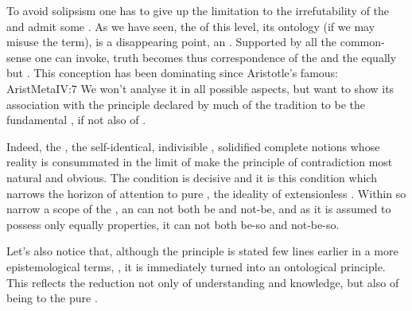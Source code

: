 To avoid solipsism one has to give up the limitation to the irrefutability of
  the  and admit some 
. As we have seen, the  of this level, 
its ontology (if we may misuse the term), is a disappearing point, an
. Supported by all the common-sense one can
invoke, truth becomes thus correspondence of the  and the equally  but . This
conception
has been dominating since Aristotle's famous:
\citet{To say of what is that it is not, or of what is not that it is, is false,
while to say of what is that it is, or of what is not that it is not, is
true.}{AristMeta}{IV:7} We won't analyse it in all possible
aspects, but want to show its association with the principle declared by much of
the tradition to be the fundamental , if not also of
. 


\pa\label{pa:logicA}
  Indeed, the , the
self-identical, indivisible , solidified complete
notions whose reality is consummated in the  limit of
 make the principle of contradiction most natural and
obvious.  The condition  is decisive and it is
this condition which narrows the horizon of attention to pure
, the ideality of extensionless . 
Within so narrow a scope of the \hoa, an  can
not both be and not-be, and as it is assumed to possess only equally
 properties, it can not both be-so and not-be-so.

Let's also notice that, although the principle is stated few lines 
earlier in a more epistemological terms, 
, it is 
immediately turned into an ontological principle. This reflects the 
reduction not only of understanding and  knowledge, 
but also of being to the pure .

